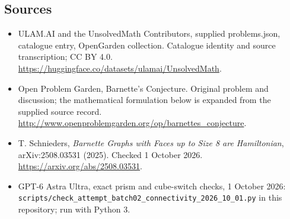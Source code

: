 \documentclass[11pt,a4paper]{article}
\begin{document}
\subsection{Sources}
\begin{itemize}
\item[S1] ULAM.AI and the UnsolvedMath Contributors, supplied problems.json, catalogue entry, OpenGarden collection. Catalogue identity and source transcription; CC BY 4.0.
\url{https://huggingface.co/datasets/ulamai/UnsolvedMath}.
\item[S2] Open Problem Garden, Barnette's Conjecture. Original problem and discussion; the mathematical formulation below is expanded from the supplied source record.
\url{http://www.openproblemgarden.org/op/barnettes_conjecture}.
\item[S3] T. Schnieders, \emph{Barnette Graphs with Faces up to Size 8 are Hamiltonian}, arXiv:2508.03531 (2025). Checked 1 October 2026.
\url{https://arxiv.org/abs/2508.03531}.
\item[S4] GPT-6 Astra Ultra, exact prism and cube-switch checks, 1 October 2026: \texttt{scripts/check\_attempt\_batch02\_connectivity\_2026\_10\_01.py} in this repository; run with Python 3.
\end{itemize}
\end{document}

